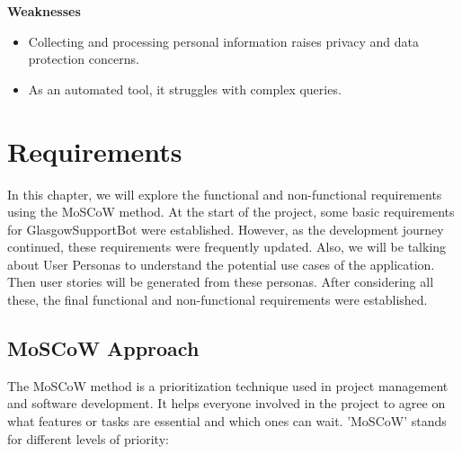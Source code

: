 \documentclass{l4proj}
\begin{document}
\textbf{Weaknesses}

\begin{itemize}

    \item Collecting and processing personal information raises privacy and data protection concerns.
    
    \item As an automated tool, it struggles with complex queries.
    
\end{itemize}




\chapter{Requirements}

In this chapter, we will explore the functional and non-functional requirements using the MoSCoW method. At the start of the project, some basic requirements for GlasgowSupportBot were established. However, as the development journey continued, these requirements were frequently updated. Also, we will be talking about User Personas to understand the potential use cases of the application. Then user stories will be generated from these personas. After considering all these, the final functional and non-functional requirements were established.

\section{MoSCoW Approach}
\label{ch:MoSCoW Approach}

The MoSCoW method is a prioritization technique used in project management and software development. It helps everyone involved in the project to agree on what features or tasks are essential and which ones can wait. 'MoSCoW' stands for different levels of priority:
\end{document}
